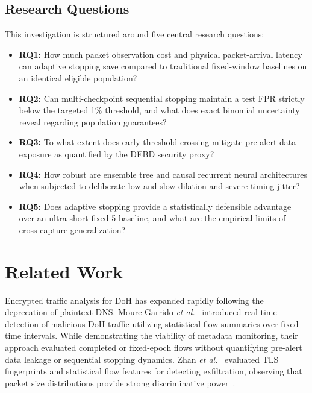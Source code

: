 \documentclass[conference]{IEEEtran}
\begin{document}
\subsection{Research Questions}
This investigation is structured around five central research questions:
\begin{itemize}
    \item \textbf{RQ1:} How much packet observation cost and physical packet-arrival latency can adaptive stopping save compared to traditional fixed-window baselines on an identical eligible population?
    \item \textbf{RQ2:} Can multi-checkpoint sequential stopping maintain a test FPR strictly below the targeted 1\% threshold, and what does exact binomial uncertainty reveal regarding population guarantees?
    \item \textbf{RQ3:} To what extent does early threshold crossing mitigate pre-alert data exposure as quantified by the DEBD security proxy?
    \item \textbf{RQ4:} How robust are ensemble tree and causal recurrent neural architectures when subjected to deliberate low-and-slow dilation and severe timing jitter?
    \item \textbf{RQ5:} Does adaptive stopping provide a statistically defensible advantage over an ultra-short fixed-5 baseline, and what are the empirical limits of cross-capture generalization?
\end{itemize}

\section{Related Work}
Encrypted traffic analysis for DoH has expanded rapidly following the deprecation of plaintext DNS. Moure-Garrido \emph{et al.}~\cite{moure2022,moure} introduced real-time detection of malicious DoH traffic utilizing statistical flow summaries over fixed time intervals. While demonstrating the viability of metadata monitoring, their approach evaluated completed or fixed-epoch flows without quantifying pre-alert data leakage or sequential stopping dynamics. Zhan \emph{et al.}~\cite{zhan2022} evaluated TLS fingerprints and statistical flow features for detecting exfiltration, observing that packet size distributions provide strong discriminative power~\cite{zhan2022,alzighaibi2023}.
\end{document}
